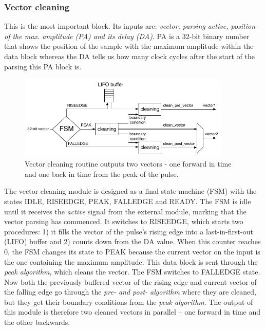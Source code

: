  
\subsubsection{Vector cleaning}
This is the most important block. Its inputs are: \emph{vector, parsing active, position of the max. amplitude (PA) and its delay (DA)}. PA is a 32-bit binary number that shows the position of the sample with the maximum amplitude within the data block whereas the DA tells us how many clock cycles after the start of the parsing this PA block is.
\begin{figure}[!t]
\centering
\includegraphics[width=0.9\textwidth]{05_current_monitoring/plots/vector_clean}
\caption{Vector cleaning routine outputs two vectors - one forward in time and one back in time from the peak of the pulse.}
\label{fig:routine}
\end{figure}
The vector cleaning module is designed as a final state machine (FSM) with the states IDLE, RISEEDGE, PEAK, FALLEDGE and READY.  The FSM is idle until it receives the \emph{active} signal from the external module, marking that the vector parsing has commenced. It switches to RISEEDGE, which starts two procedures: 1) it fills the vector of the pulse's rising edge into a last-in-first-out (LIFO) buffer and 2) counts down from the DA value. When this counter reaches 0, the FSM changes its state to PEAK because the current vector on the input is the one containing the maximum amplitude. This data block is sent through the \emph{peak algorithm}, which cleans the vector. The FSM switches to FALLEDGE state. Now both the previously buffered vector of the rising edge and current vector of the falling edge go through the \emph{pre- and post- algorithm} where they are cleaned, but they get their boundary conditions from the \emph{peak algorithm}. The output of this module is therefore two cleaned vectors in parallel -- one forward in time and the other backwards.



